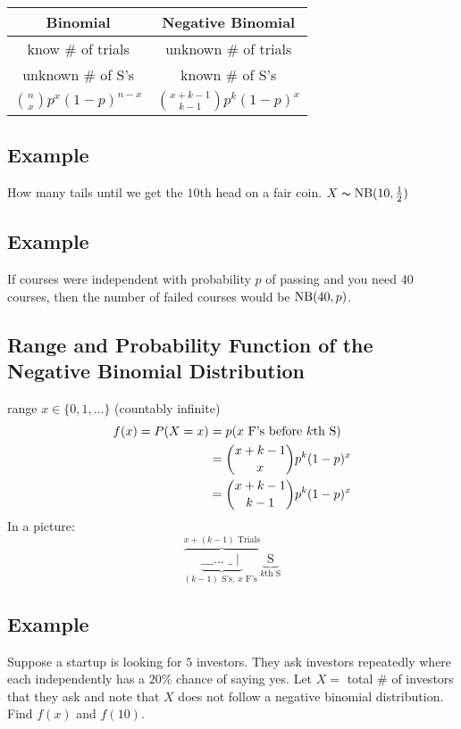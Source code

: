 \begin{center}
    \begin{tabular}{|c|c|}
        \hline
        Binomial & Negative Binomial \\
        \hline
        know \# of trials & unknown \# of trials\\
        unknown \# of S's & known \# of S's\\
        $ \binom{n}{x}p^x(1-p)^{n-x} $ & 
        $ \binom{x+k-1}{k-1}p^k(1-p)^x $\\
        \hline
    \end{tabular}
\end{center}

\subsection{Example}
How many tails until we get the $10$th head on a fair coin.
$ X\thicksim\operatorname{NB}(10,\frac{1}{2}) $

\subsection{Example}
If courses were independent with probability $ p $ of passing
and you need $ 40 $ courses, then the number of failed courses
would be $ \operatorname{NB}(40,p) $.

\subsection{Range and Probability Function of the Negative Binomial Distribution}
range $ x\in\{0,1,\dots\} $ (countably infinite)
\begin{align*}
    f(x)=P(X=x)
    &=p(x\text{ F's before $ k $th S})\\
    &=\binom{x+k-1}{x}p^k(1-p)^x\\
    &=\binom{x+k-1}{k-1}p^k(1-p)^x
\end{align*}
In a picture:
\[\overbrace{
    \underbrace{
        \text{\_ \_ \_ $\ldots$ \_}\mid}
        _{(k-1) \text{ S's, }x \text{ F's }}}^{x+(k-1)\text{ Trials}}
\underbrace{ \text{ S } }_{ k\text{th S} } \]

\subsection{Example}
Suppose a startup is looking for $ 5 $ investors. They ask
investors repeatedly where each independently has a $ 20\% $ chance
of saying yes. Let $ X= $ total \# of investors that they ask and
note that $ X $ does not follow a negative binomial distribution.
Find $ f(x) $ and $ f(10) $.


